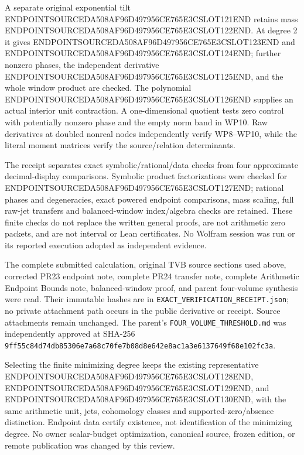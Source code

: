 A separate original exponential tilt ENDPOINTSOURCEDA508AF96D497956CE765E3CSLOT121END retains mass ENDPOINTSOURCEDA508AF96D497956CE765E3CSLOT122END. At degree 2 it gives ENDPOINTSOURCEDA508AF96D497956CE765E3CSLOT123END and ENDPOINTSOURCEDA508AF96D497956CE765E3CSLOT124END; further nonzero phases, the independent derivative ENDPOINTSOURCEDA508AF96D497956CE765E3CSLOT125END, and the whole window product are checked. The polynomial ENDPOINTSOURCEDA508AF96D497956CE765E3CSLOT126END supplies an actual interior unit contraction. A one-dimensional quotient tests zero control with potentially nonzero phase and the empty norm band in WP10. Raw derivatives at doubled nonreal nodes independently verify WP8--WP10, while the literal moment matrices verify the source/relation determinants.

The receipt separates exact symbolic/rational/data checks from four approximate decimal-display comparisons. Symbolic product factorizations were checked for ENDPOINTSOURCEDA508AF96D497956CE765E3CSLOT127END; rational phases and degeneracies, exact powered endpoint comparisons, mass scaling, full raw-jet transfers and balanced-window index/algebra checks are retained. These finite checks do not replace the written general proofs, are not arithmetic zero packets, and are not interval or Lean certificates. No Wolfram session was run or its reported execution adopted as independent evidence.

The complete submitted calculation, original TVB source sections used above, corrected PR23 endpoint note, complete PR24 transfer note, complete Arithmetic Endpoint Bounds note, balanced-window proof, and parent four-volume synthesis were read. Their immutable hashes are in \texttt{EXACT\_VERIFICATION\_RECEIPT.json}; no private attachment path occurs in the public derivative or receipt. Source attachments remain unchanged. The parent's \texttt{FOUR\_VOLUME\_THRESHOLD.md} was independently approved at SHA-256 \texttt{9ff55c84d74db85306e7a68c70fe7b08d8e642e8ac1a3e6137649f68e102fc3a}.

Selecting the finite minimizing degree keeps the existing representative ENDPOINTSOURCEDA508AF96D497956CE765E3CSLOT128END, ENDPOINTSOURCEDA508AF96D497956CE765E3CSLOT129END, and ENDPOINTSOURCEDA508AF96D497956CE765E3CSLOT130END, with the same arithmetic unit, jets, cohomology classes and supported-zero/absence distinction. Endpoint data certify existence, not identification of the minimizing degree. No owner scalar-budget optimization, canonical source, frozen edition, or remote publication was changed by this review.
